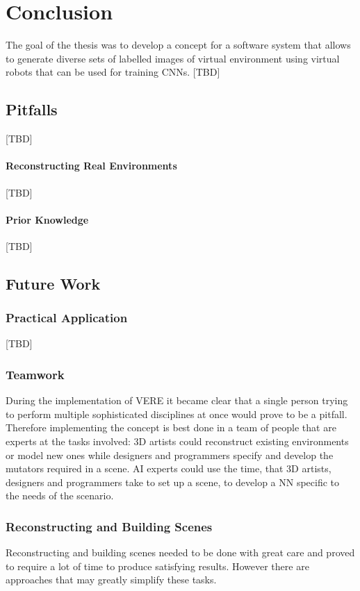 \chapter{Conclusion}
The goal of the thesis was to develop a concept for a software system that allows to generate diverse sets of labelled images of virtual environment using virtual robots that can be used for training \acp{CNN}. 
[TBD]


\section{Pitfalls} 
[TBD]
\subsubsection{Reconstructing Real Environments}
[TBD]
\subsubsection{Prior Knowledge}
[TBD]

\section{Future Work}
\subsection{Practical Application}
[TBD]

\subsection{Teamwork}
During the implementation of \ac{VERE} it became clear that a single person trying to perform multiple sophisticated disciplines at once would prove to be a pitfall. Therefore implementing the concept is best done in a team of people that are experts at the tasks involved: 3D artists could reconstruct existing environments or model new ones while designers and programmers specify and develop the mutators required in a scene. \ac{AI} experts could use the time, that 3D artists, designers and programmers take to set up a scene, to develop a \ac{NN} specific to the needs of the scenario.

\subsection{Reconstructing and Building Scenes}
Reconstructing and building scenes needed to be done with great care and proved to require a lot of time to produce satisfying results. However there are approaches that may greatly simplify these tasks.
